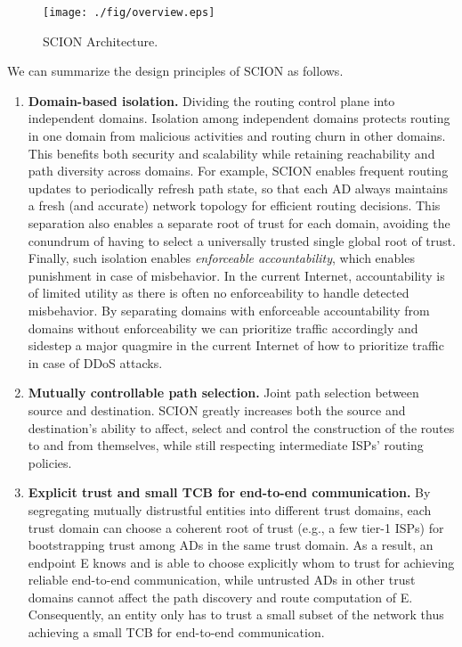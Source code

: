 \begin{figure*}[ht]
\centering
\texttt{[image: ./fig/overview.eps]}
\caption{SCION Architecture.}\label{fig:overview}
\end{figure*}

We can summarize the design principles of SCION as follows.
\begin{enumerate}
\item {\bf Domain-based isolation.} Dividing the routing control plane into
  independent domains. Isolation among independent domains protects routing in
  one domain from malicious activities and routing churn in other domains. This
  benefits both security and scalability while retaining reachability and path
  diversity across domains. For example, SCION enables frequent routing updates
  to periodically refresh path state, so that each AD always maintains a fresh
  (and accurate) network topology for efficient routing decisions. This
  separation also enables a separate root of trust for each domain, avoiding the
  conundrum of having to select a universally trusted single global root of
  trust. Finally, such isolation enables \textit{enforceable accountability},
  which enables punishment in case of misbehavior. In the current Internet,
  accountability is of limited utility as there is often no enforceability to
  handle detected misbehavior. By separating domains with enforceable
  accountability from domains without enforceability we can prioritize traffic
  accordingly and sidestep a major quagmire in the current Internet of how to
  prioritize traffic in case of DDoS attacks.
\item {\bf Mutually controllable path selection.} Joint path selection between
  source and destination. SCION greatly increases both the source and
  destination’s ability to affect, select and control the construction of the
  routes to and from themselves, while still respecting intermediate ISPs’
  routing policies.
\item {\bf Explicit trust and small TCB for end-to-end communication.} By
  segregating mutually distrustful entities into different trust domains, each
  trust domain can choose a coherent root of trust (e.g., a few tier-1 ISPs) for
  bootstrapping trust among ADs in the same trust domain. As a result, an
  endpoint E knows and is able to choose explicitly whom to trust for achieving
  reliable end-to-end communication, while untrusted ADs in other trust domains
  cannot affect the path discovery and route computation of E. Consequently, an
  entity only has to trust a small subset of the network thus achieving a small
  TCB for end-to-end communication.
\end{enumerate}


